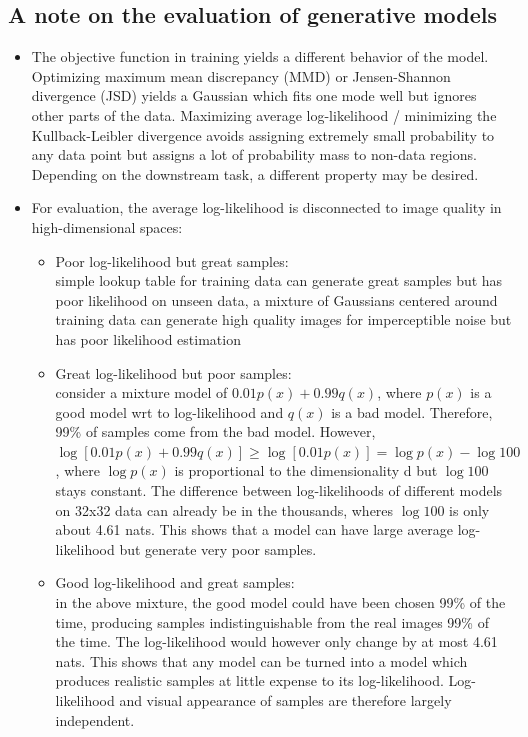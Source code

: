 \documentclass{article}
\begin{document}
\subsection{A note on the evaluation of generative models}
\begin{itemize}
    \item The objective function in training yields a different behavior of the model. Optimizing maximum mean discrepancy (MMD) or Jensen-Shannon divergence (JSD) yields a Gaussian which fits one mode well but ignores other parts of the data. Maximizing average log-likelihood / minimizing the Kullback-Leibler divergence avoids assigning extremely small probability to any data point but assigns a lot of probability mass to non-data regions. Depending on the downstream task, a different property may be desired.
    \item For evaluation, the average log-likelihood is disconnected to image quality in high-dimensional spaces:
    \begin{itemize}
        \item Poor log-likelihood but great samples:\\ simple lookup table for training data can generate great samples but has poor likelihood on unseen data, a mixture of Gaussians centered around training data can generate high quality images for imperceptible noise but has poor likelihood estimation 
        \item Great log-likelihood but poor samples:\\ consider a mixture model of $0.01 p(x) + 0.99 q(x)$, where $p(x)$ is a good model wrt to log-likelihood and $q(x)$ is a bad model. Therefore, 99\% of samples come from the bad model. However, $\log[0.01 p(x) + 0.99 q(x)]\geq \log[0.01 p(x)]=\log p(x) - \log 100$, where $\log p(x)$ is proportional to the dimensionality d but $\log 100$ stays constant. The difference between log-likelihoods of different models on 32x32 data can already be in the thousands, wheres $\log 100$ is only about 4.61 nats. This shows that a model can have large average log-likelihood but generate very poor samples.
        \item Good log-likelihood and great samples: \\ in the above mixture, the good model could have been chosen 99\% of the time, producing samples indistinguishable from the real images 99\% of the time. The log-likelihood would however only change by at most 4.61 nats. This shows that any model can be turned into a model which produces realistic samples at little expense to its log-likelihood. Log-likelihood and visual appearance of samples are therefore largely independent.

\end{itemize}
\end{itemize}
\end{document}
